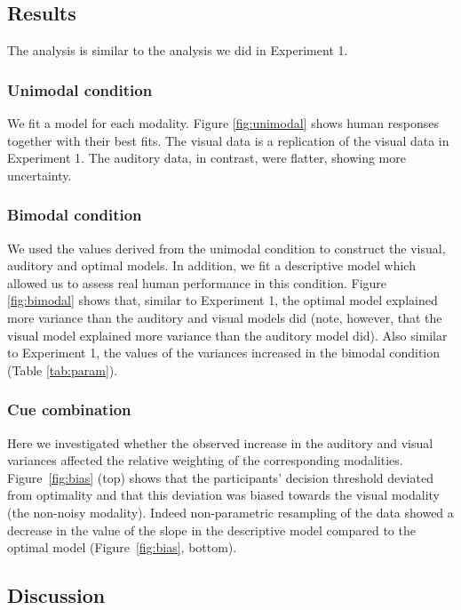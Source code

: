 \documentclass[english,,man,floatsintext]{apa6}
\theoremstyle{definition}
\theoremstyle{definition}
\theoremstyle{definition}
\theoremstyle{remark}
\begin{document}
\subsection{Results}\label{results}

The analysis is similar to the analysis we did in Experiment 1.

\subsubsection{Unimodal condition}\label{unimodal-condition}

We fit a model for each modality. Figure \ref{fig:unimodal} shows human
responses together with their best fits. The visual data is a
replication of the visual data in Experiment 1. The auditory data, in
contrast, were flatter, showing more uncertainty.

\subsubsection{Bimodal condition}\label{bimodal-condition-2}

We used the values derived from the unimodal condition to construct the
visual, auditory and optimal models. In addition, we fit a descriptive
model which allowed us to assess real human performance in this
condition. Figure \ref{fig:bimodal} shows that, similar to Experiment 1,
the optimal model explained more variance than the auditory and visual
models did (note, however, that the visual model explained more variance
than the auditory model did). Also similar to Experiment 1, the values
of the variances increased in the bimodal condition (Table
\ref{tab:param}).

\subsubsection{Cue combination}\label{cue-combination-1}

Here we investigated whether the observed increase in the auditory and
visual variances affected the relative weighting of the corresponding
modalities. Figure~\ref{fig:bias} (top) shows that the participants'
decision threshold deviated from optimality and that this deviation was
biased towards the visual modality (the non-noisy modality). Indeed
non-parametric resampling of the data showed a decrease in the value of
the slope in the descriptive model compared to the optimal model
(Figure~\ref{fig:bias}, bottom).

\subsection{Discussion}\label{discussion-1}
\end{document}
